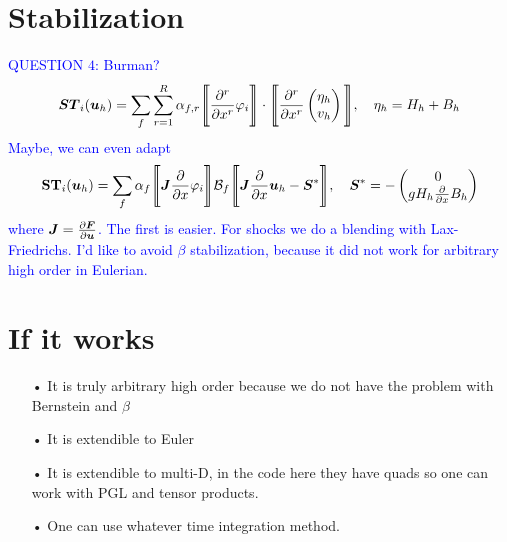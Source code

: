 \documentclass[english]{article}
\theoremstyle{thmstyleone}
\theoremstyle{thmstyletwo}
\theoremstyle{thmstylethree}
\newcommand{\uapp}[0]{\uvec{u}_h}
\newcommand{\uvec}[2][3]{\boldsymbol{#2\mkern-#1mu}\mkern#1mu}
\begin{document}
\section{Stabilization}
\textcolor{blue}{
QUESTION $4$: Burman?
\begin{align}
\uvec{ST}_i(\uapp)=\sum_f\sum_{r=1}^R \alpha_{f,r} \Bigg\llbracket \frac{\partial^r}{\partial x^r} \varphi_i \Bigg\rrbracket \cdot \Bigg\llbracket \frac{\partial^r}{\partial x^r} \begin{pmatrix}
\eta_h\\
v_h
\end{pmatrix} \Bigg\rrbracket  , \quad \eta_h=H_h+B_h
\label{eq:jt}
\end{align}
Maybe, we can even adapt
\begin{align}
\textbf{ST}_i(\uapp)=\sum_{f}\alpha_f  \Bigg\llbracket \uvec{J}  \frac{\partial}{\partial x} \varphi_i \Bigg\rrbracket \mathcal{B}_f \Bigg\llbracket \uvec{J}\frac{\partial}{\partial x} \uvec{u}_h-\boldsymbol{S}^* \Bigg\rrbracket, \quad \boldsymbol{S}^*=-\begin{pmatrix}
0\\
gH_h \frac{\partial}{\partial x}B_h
\end{pmatrix} 
\label{eq:jr}
\end{align}
where $\uvec{J}=\frac{\partial \uvec{F}}{\partial \uvec{u}}$.
%
The first is easier. For shocks we do a blending with Lax-Friedrichs. I'd like to avoid $\beta$ stabilization, because it did not work for arbitrary high order in Eulerian.
%
}

\section{If it works}

\begin{itemize}

\item[•] It is truly arbitrary high order because we do not have the problem with Bernstein and $\beta$

\item[•] It is extendible to Euler

\item[•] It is extendible to multi-D, in the code here they have quads so one can work with PGL and tensor products.

\item[•] One can use whatever time integration method.

\end{itemize}



\end{document}
